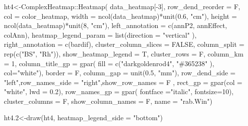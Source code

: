 \documentclass[]{interact}
\theoremstyle{plain}%
\theoremstyle{definition}
\theoremstyle{remark}
\newenvironment{Shaded}{\begin{snugshade}}{\end{snugshade}}
\newcommand{\AttributeTok}[1]{\textcolor[rgb]{0.77,0.63,0.00}{#1}}
\newcommand{\ConstantTok}[1]{\textcolor[rgb]{0.00,0.00,0.00}{#1}}
\newcommand{\DecValTok}[1]{\textcolor[rgb]{0.00,0.00,0.81}{#1}}
\newcommand{\FloatTok}[1]{\textcolor[rgb]{0.00,0.00,0.81}{#1}}
\newcommand{\FunctionTok}[1]{\textcolor[rgb]{0.00,0.00,0.00}{#1}}
\newcommand{\NormalTok}[1]{#1}
\newcommand{\OtherTok}[1]{\textcolor[rgb]{0.56,0.35,0.01}{#1}}
\newcommand{\SpecialCharTok}[1]{\textcolor[rgb]{0.00,0.00,0.00}{#1}}
\newcommand{\StringTok}[1]{\textcolor[rgb]{0.31,0.60,0.02}{#1}}
\begin{document}
\begin{Shaded}
\begin{Highlighting}[]
\NormalTok{ht4}\OtherTok{\textless{}{-}}\NormalTok{ComplexHeatmap}\SpecialCharTok{::}\FunctionTok{Heatmap}\NormalTok{(}
\NormalTok{  data\_heatmap[}\SpecialCharTok{{-}}\DecValTok{3}\NormalTok{],  }\AttributeTok{row\_dend\_reorder =}\NormalTok{ F, }\AttributeTok{col =}\NormalTok{ color\_heatmap,}
  \AttributeTok{width =} \FunctionTok{ncol}\NormalTok{(data\_heatmap)}\SpecialCharTok{*}\FunctionTok{unit}\NormalTok{(}\FloatTok{0.6}\NormalTok{, }\StringTok{"cm"}\NormalTok{),}
  \AttributeTok{height =} \FunctionTok{ncol}\NormalTok{(data\_heatmap)}\SpecialCharTok{*}\FunctionTok{unit}\NormalTok{(}\DecValTok{8}\NormalTok{, }\StringTok{"cm"}\NormalTok{),}
  \AttributeTok{left\_annotation =}  \FunctionTok{c}\NormalTok{(annP2, annEffect, colAnn),}
  \AttributeTok{heatmap\_legend\_param =} \FunctionTok{list}\NormalTok{(}\AttributeTok{direction =} \StringTok{"vertical"}\NormalTok{ ),}
  \AttributeTok{right\_annotation =} \FunctionTok{c}\NormalTok{(bardif),}
  \AttributeTok{cluster\_column\_slices =} \ConstantTok{FALSE}\NormalTok{,}
  \AttributeTok{column\_split =} \FunctionTok{rep}\NormalTok{(}\FunctionTok{c}\NormalTok{(}\StringTok{"BS"}\NormalTok{, }\StringTok{"Rh"}\NormalTok{)),}
  \AttributeTok{show\_heatmap\_legend =}\NormalTok{ T,}
  \AttributeTok{cluster\_rows =}\NormalTok{ F,}
  \AttributeTok{column\_km =} \DecValTok{1}\NormalTok{, }\AttributeTok{column\_title\_gp =} \FunctionTok{gpar}\NormalTok{(}
  \AttributeTok{fill =} \FunctionTok{c}\NormalTok{(}\StringTok{"darkgoldenrod4"}\NormalTok{, }\StringTok{"\#365238"}\NormalTok{ ), }\AttributeTok{col=}\StringTok{"white"}\NormalTok{),}
  \AttributeTok{border =}\NormalTok{ F, }\AttributeTok{column\_gap =} \FunctionTok{unit}\NormalTok{(}\FloatTok{0.5}\NormalTok{, }\StringTok{"mm"}\NormalTok{),}
  \AttributeTok{row\_dend\_side =} \StringTok{"left"}\NormalTok{,}\AttributeTok{row\_names\_side =} \StringTok{"right"}\NormalTok{,}\AttributeTok{show\_row\_names =}\NormalTok{ F ,}
  \AttributeTok{rect\_gp =} \FunctionTok{gpar}\NormalTok{(}\AttributeTok{col =} \StringTok{"white"}\NormalTok{, }\AttributeTok{lwd =} \FloatTok{0.2}\NormalTok{), }\AttributeTok{row\_names\_gp =} \FunctionTok{gpar}\NormalTok{(}
  \AttributeTok{fontface =}\StringTok{"italic"}\NormalTok{, }\AttributeTok{fontsize=}\DecValTok{10}\NormalTok{),}
  \AttributeTok{cluster\_columns =}\NormalTok{ F,}
  \AttributeTok{show\_column\_names =}\NormalTok{ F, }\AttributeTok{name =} \StringTok{"rab.Win"}\NormalTok{)}

\NormalTok{ht4}\FloatTok{.2}\OtherTok{\textless{}{-}}\FunctionTok{draw}\NormalTok{(ht4, }\AttributeTok{heatmap\_legend\_side =} \StringTok{"bottom"}\NormalTok{)}
\end{Highlighting}
\end{Shaded}
\end{document}
